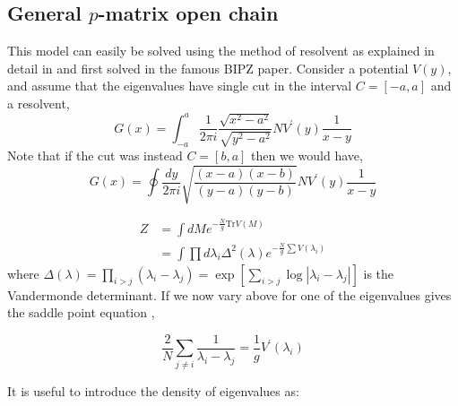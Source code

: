 \documentclass[11pt]{article}
\begin{document}

\subsection{General $p$-matrix open chain}








This model can easily be solved using the method of resolvent as explained in detail in \cite{DiFrancesco:1993cyw, Marino:2004eq} and first solved in the 
famous BIPZ \cite{Brezin:1977sv} paper. 
Consider a potential $V(y)$, 
and assume that the eigenvalues have single cut in the interval $ C = [-a,a]$ and a resolvent, 
\begin{equation}
G(x) = \int_{-a}^{a} \frac{1}{2\pi i} \frac{\sqrt{x^2-a^2}}{\sqrt{y^2-a^2}} N V^{\prime}(y) \frac{1}{x-y} 
\end{equation}
Note that if the cut was instead $ C= [b,a]$ then we would have, 
\begin{equation}
G(x) = \oint \frac{dy}{2\pi i} \sqrt{\frac{(x-a) (x-b)}{(y-a)(y-b)}}  N V^{\prime}(y) \frac{1}{x-y} 
\end{equation}

\begin{align}
	Z &= \int dM e^{-\frac{N}{g} \mbox{Tr} V(M)} \\
	& = \int \prod d\lambda_{i} \Delta^2(\lambda)  e^{-\frac{N}{g} \sum V(\lambda_i)} 
\end{align}
where $\Delta(\lambda) = \prod_{i > j} (\lambda_i - \lambda_j) = \exp[\sum_{i>j} \log |\lambda_{i} - \lambda_{j}|]$ is the Vandermonde 
determinant. If we now vary above for one of the eigenvalues gives the saddle point equation , 

\begin{equation}
	\label{eq:v_saddle}
	\frac{2}{N} \sum_{j \neq i} \frac{1}{\lambda_i - \lambda_j} = \frac{1}{g} V^{\prime}(\lambda_i)
\end{equation}

It is useful to introduce the density of eigenvalues as:
\end{document}
